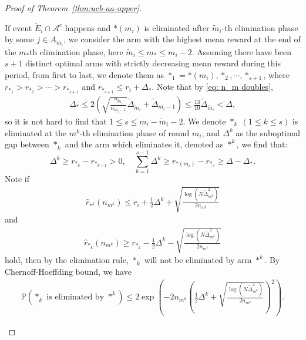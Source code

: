 \documentclass[
  12pt]{article}
\begin{document}
\begin{proof}[Proof of Theorem~\ref{thm:ucb-aa-upper}]
\begin{itemize}
If event $\tilde{E}_i\cap\mathcal{A}^c$ happens and $*(m_i)$ is eliminated after $\tilde{m}_i$-th elimination phase by some $j\in A_{m_i}$, we consider the arm with the highest mean reward at the end of the $m_*$th elimination phase, here $\tilde{m}_i\leq m_*\leq m_i-2$. Assuming there have been $s+1$ distinct optimal arms with strictly decreasing mean reward during this period, from first to last, we denote them as $*_1=*(m_i),*_2,\cdots, *_{s+1}$, where $r_{*_1}>r_{*_2}>\cdots> r_{*_{s+1}}$ and $r_{*_{s+1}}\leq r_i+\Delta_*$. Note that by \eqref{eq: n_m doubles},
\begin{align*}
    \Delta_*\leq2\left(\sqrt{\frac{n_{\tilde{m}_i}}{n_{m_i-1}}}\tilde{\Delta}_{\tilde{m}_i}+\tilde{\Delta}_{m_i-1}\right)\leq \frac{13}{10}\tilde{\Delta}_{\tilde{m}_i}< \Delta,
\end{align*}
so it is not hard to find that $1\leq s\leq m_i-\tilde{m}_i-2$. We denote $*_k\;(1\leq k\leq s)$ is eliminated at the $m^k$-th elimination phase of round $m_i$, and $\Delta^k$ as the suboptimal gap between $*_k$ and the arm which eliminates it, denoted as $*^k$, we find that:
\[\Delta^k\geq r_{*_{k}}-r_{*_{k+1}}>0,\quad \sum _{k=1}^{s-1}\Delta^k\geq r_{*(m_i)}-r_{*_s}\geq \Delta-\Delta_*.\]
Note if
\begin{align*}
    \hat{r}_{*^k}(n_{m^k}) \leq r_i +\frac{1}{2}\Delta^k +\sqrt{\frac{\log(N \tilde{\Delta}_{m^k}^2)}{2n_{m^k}}} 
\end{align*}
and  
\begin{align*}
    \hat{r}_{*_k}(n_{m^k}) \geq r_{*_k} -\frac{1}{2}\Delta^k-\sqrt{\frac{\log(N \tilde{\Delta}_{m^k}^2)}{2n_{m^k}}} 
\end{align*}
hold, then by the elimination rule, $*_k$ will not be eliminated by arm $*^k$. By Chernoff-Hoeffding bound, we have
\begin{align*}
\mathbb{P}\left(\text{$*_k$ is eliminated by $*^k$} \right)\leq 2\exp\left(-2n_{m^k}\left(\frac{1}{2}\Delta^k +\sqrt{\frac{\log(N \tilde{\Delta}_{m^k}^2)}{2n_{m^k}}}\right)^2\right).
\end{align*}


\end{itemize}
\end{proof}
\end{document}

